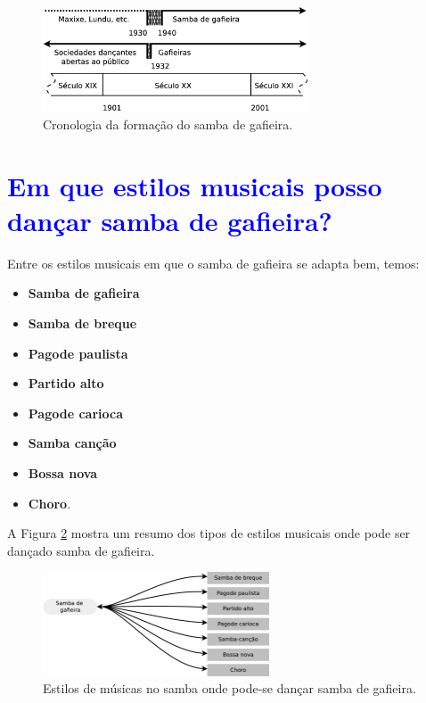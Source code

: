 \begin{figure}[h]
  \centering
    \includegraphics[width=0.7\textwidth]{chapters/cap-historia-sambagafieira/gafieira-crono.eps}
  \caption{ Cronologia da formação do samba de gafieira.}
\label{fig:sambagafieiracrono}
\end{figure}


\section{\textcolor{blue}{Em que estilos musicais posso dançar samba de gafieira?}}
\label{subsec:gafieiradancaestilos}

Entre os estilos musicais em que o samba de gafieira se adapta bem, temos:
\begin{itemize}
\item \textbf{Samba de gafieira}
\item \textbf{Samba de breque}
\item \textbf{Pagode paulista}
\item \textbf{Partido alto}
\item \textbf{Pagode carioca}
\item \textbf{Samba canção}
\item \textbf{Bossa nova}
\item \textbf{Choro}.
\end{itemize}

A Figura \ref{fig:gafieiradancaestilos} mostra um resumo dos 
tipos de estilos musicais onde pode ser dançado samba de gafieira.
\begin{figure}[h]
  \centering
    \includegraphics[width=0.6\textwidth]{chapters/cap-historia-sambagafieira/gafieiravcmusica.eps}
  \caption{ Estilos de músicas no samba onde pode-se dançar samba de gafieira.}
\label{fig:gafieiradancaestilos}
\end{figure}

